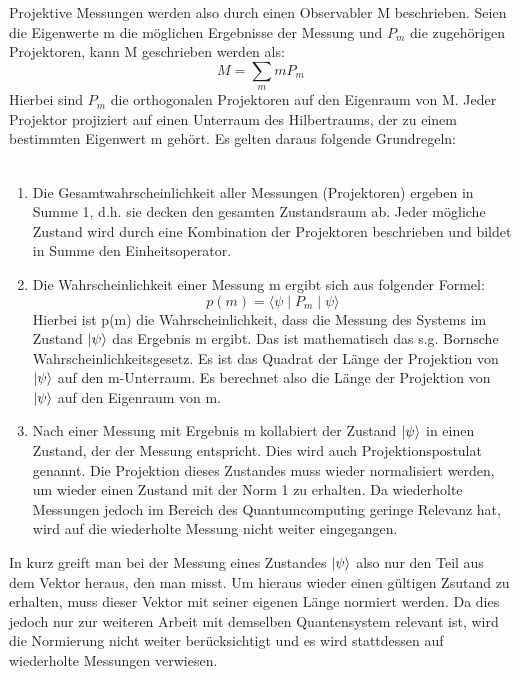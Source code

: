Projektive Messungen werden also durch einen Observabler M beschrieben. Seien die Eigenwerte m die möglichen Ergebnisse der Messung und $P_m$ die zugehörigen Projektoren, kann M geschrieben werden als:
\begin{equation}
    M = \sum_m mP_m
\end{equation}
Hierbei sind $P_m$ die orthogonalen Projektoren auf den Eigenraum von M. Jeder Projektor projiziert auf einen Unterraum des Hilbertraums, der zu einem bestimmten Eigenwert m gehört. %
Es gelten daraus folgende Grundregeln: \\ \\
\begin{enumerate}
\item Die Gesamtwahrscheinlichkeit aller Messungen (Projektoren) ergeben in Summe 1, d.h. sie decken den gesamten Zustandsraum ab. Jeder mögliche Zustand wird durch eine Kombination der Projektoren beschrieben und bildet in Summe den Einheitsoperator. \\
\item Die Wahrscheinlichkeit einer Messung m ergibt sich aus folgender Formel:
\begin{equation}
    p(m) = \langle \psi \mid P_m \mid \psi \rangle
\end{equation}
Hierbei ist p(m) die Wahrscheinlichkeit, dass die Messung des Systems im Zustand $\ket\psi$ das Ergebnis m ergibt. Das ist mathematisch das s.g. Bornsche Wahrscheinlichkeitsgesetz.
Es ist das Quadrat der Länge der Projektion von $\ket\psi$ auf den m-Unterraum. Es berechnet also die Länge der Projektion von $\ket\psi$ auf den Eigenraum von m. \\
\item Nach einer Messung mit Ergebnis m kollabiert der Zustand $\ket\psi$ in einen Zustand, der der Messung entspricht. Dies wird auch Projektionspostulat genannt. Die Projektion dieses Zustandes muss wieder normalisiert werden, um wieder einen Zustand mit der Norm 1 zu erhalten.
Da wiederholte Messungen jedoch im Bereich des Quantumcomputing geringe Relevanz hat, wird auf die wiederholte Messung nicht weiter eingegangen. \\ 
\end{enumerate}

In kurz greift man bei der Messung eines Zustandes $\ket\psi$ also nur den Teil aus dem Vektor heraus, den man misst. Um hieraus wieder einen gültigen Zsutand zu erhalten, muss dieser Vektor mit seiner eigenen Länge normiert werden. Da dies jedoch nur zur weiteren Arbeit mit demselben Quantensystem relevant ist, wird die Normierung nicht weiter berücksichtigt und es wird stattdessen auf wiederholte Messungen verwiesen.
\cite{kasirajan_fundamentals_2021} 

